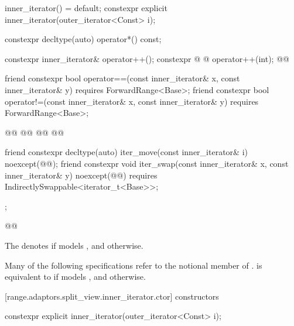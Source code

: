 {\begin{codeblock}
{{    inner_iterator() = default;
    constexpr explicit inner_iterator(outer_iterator<Const> i);

    constexpr decltype(auto) operator*() const;

    constexpr inner_iterator& operator++();
    constexpr @ @ operator++(int);
    @@

    friend constexpr bool operator==(const inner_iterator& x, const inner_iterator& y)
      requires ForwardRange<Base>;
    friend constexpr bool operator!=(const inner_iterator& x, const inner_iterator& y)
      requires ForwardRange<Base>;

    @@
    @@
    @@
    @@

    friend constexpr decltype(auto) iter_move(const inner_iterator& i)
      noexcept(@\oldtxt{\seebelow}@);
    friend constexpr void iter_swap(const inner_iterator& x, const inner_iterator& y)
      noexcept(@\oldtxt{\seebelow}@)
      requires IndirectlySwappable<iterator_t<Base>>;
  };
}@\oldtxt{\}}@
\end{codeblock}

{\color{newclr}
\pnum
The   denotes
 if
 models
, and 
otherwise.

\pnum
Many of the following specifications refer to the notional member
 of .
 is equivalent to  if 
models , and  otherwise.
} %

[range.adaptors.split_view.inner_iterator.ctor]{ constructors}

%
\begin{itemdecl}
constexpr explicit inner_iterator(outer_iterator<Const> i);
\end{itemdecl}

}
